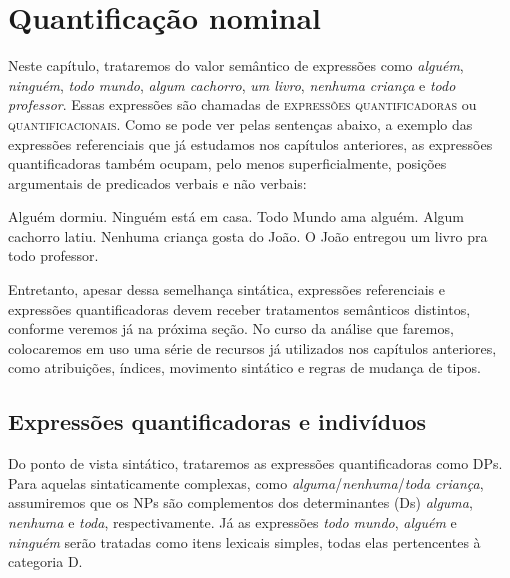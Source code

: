 
\chapter{Quantificação nominal}

Neste capítulo, trataremos do valor semântico de expressões como
\textit{alguém}, \textit{ninguém}, \textit{todo mundo}, \textit{algum cachorro}, \textit{um livro},
\textit{nenhuma criança} e \textit{todo professor}. Essas expressões são
chamadas de \textsc{expressões quantificadoras} ou
\textsc{quantificacionais}. Como se pode ver pelas sentenças
abaixo, a exemplo das expressões referenciais que já estudamos nos
capítulos anteriores, as expressões quantificadoras também ocupam,
pelo menos superficialmente, posições argumentais de predicados
verbais e não verbais:


\begin{exe}
    \ex\label{conw}
    \begin{xlist}
        \ex  Alguém dormiu.\label{conwa}
        \ex  Ninguém está em casa.\label{conwz}
        \ex  Todo Mundo ama alguém.\label{conwc}
        \ex  Algum cachorro latiu.\label{conwd}
        \ex  Nenhuma criança gosta do João.\label{conwe}
        \ex  O João entregou um livro pra todo professor.\label{conwf}
    \end{xlist}
\end{exe}

\n  Entretanto, apesar dessa semelhança sintática, expressões
referenciais e expressões quantificadoras devem receber
tratamentos semânticos distintos, conforme veremos já na próxima
seção. No curso da análise que faremos, colocaremos em uso uma
série de recursos já utilizados nos capítulos anteriores, como
atribuições, índices, movimento sintático e regras de mudança
de tipos.

\section{Expressões quantificadoras e indivíduos}

Do ponto de vista sintático, trataremos as expressões
quantificadoras como DPs. Para aquelas sintaticamente complexas,
como \textit{alguma}/\textit{nenhuma}/\textit{toda criança}, assumiremos que os NPs são
complementos dos determinantes (Ds) \textit{alguma}, \textit{nenhuma} e \textit{toda},
respectivamente. Já as expressões \textit{todo mundo}, \textit{alguém} e
\textit{ninguém} serão tratadas como itens lexicais simples, todas elas
pertencentes à categoria D. \\

